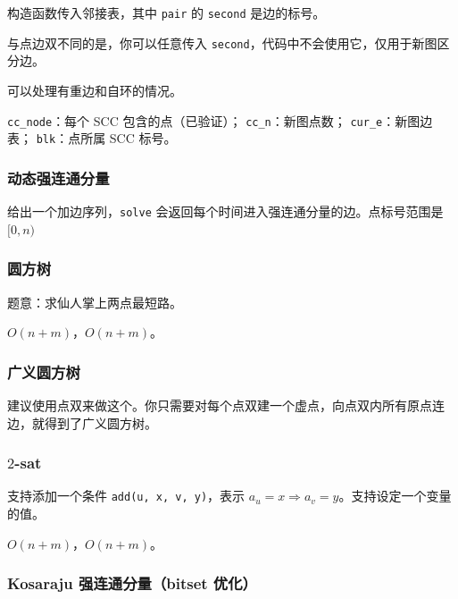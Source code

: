 \documentclass[12pt]{ctexart}
\begin{document}
构造函数传入邻接表，其中 \verb|pair| 的 \verb|second| 是边的标号。

与点边双不同的是，你可以任意传入 \verb|second|，代码中不会使用它，仅用于新图区分边。

可以处理有重边和自环的情况。

\verb|cc_node|：每个 SCC 包含的点（已验证）；
\verb|cc_n|：新图点数；
\verb|cur_e|：新图边表；
\verb|blk|：点所属 SCC 标号。



\subsubsection{动态强连通分量}

给出一个加边序列，\verb|solve| 会返回每个时间进入强连通分量的边。点标号范围是 $[0,n)$



\subsubsection{圆方树}

题意：求仙人掌上两点最短路。

$O(n+m)$，$O(n+m)$。



\subsubsection{广义圆方树}

建议使用点双来做这个。你只需要对每个点双建一个虚点，向点双内所有原点连边，就得到了广义圆方树。



\subsubsection{$2$-sat}

支持添加一个条件 \verb|add(u, x, v, y)|，表示 $a_u=x\Rightarrow a_v=y$。支持设定一个变量的值。

$O(n+m)$，$O(n+m)$。




\subsubsection{Kosaraju 强连通分量（bitset 优化）}
\end{document}
